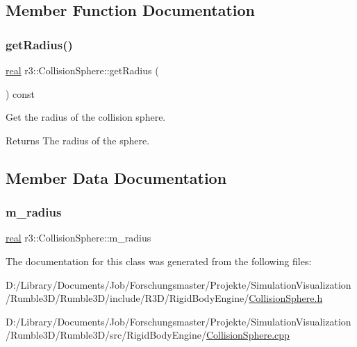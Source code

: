 \subsection{Member Function Documentation}
\mbox{\label{classr3_1_1_collision_sphere_aa3b7687165b34ab82b3bedb0884cc65b}} 
\subsubsection{\texorpdfstring{get\+Radius()}{getRadius()}}
{\footnotesize\ttfamily \mbox{\hyperlink{namespacer3_ab2016b3e3f743fb735afce242f0dc1eb}{real}} r3\+::\+Collision\+Sphere\+::get\+Radius (\begin{DoxyParamCaption}{ }\end{DoxyParamCaption}) const}



Get the radius of the collision sphere. 

\begin{DoxyReturn}{Returns}
The radius of the sphere. 
\end{DoxyReturn}


\subsection{Member Data Documentation}
\mbox{\label{classr3_1_1_collision_sphere_abc9e3dcae422b4732a288fa19d89d466}} 
\subsubsection{\texorpdfstring{m\+\_\+radius}{m\_radius}}
{\footnotesize\ttfamily \mbox{\hyperlink{namespacer3_ab2016b3e3f743fb735afce242f0dc1eb}{real}} r3\+::\+Collision\+Sphere\+::m\+\_\+radius\hspace{0.3cm}{\ttfamily [protected]}}



The documentation for this class was generated from the following files\+:\begin{DoxyCompactItemize}
\item 
D\+:/\+Library/\+Documents/\+Job/\+Forschungsmaster/\+Projekte/\+Simulation\+Visualization/\+Rumble3\+D/\+Rumble3\+D/include/\+R3\+D/\+Rigid\+Body\+Engine/\mbox{\hyperlink{_collision_sphere_8h}{Collision\+Sphere.\+h}}\item 
D\+:/\+Library/\+Documents/\+Job/\+Forschungsmaster/\+Projekte/\+Simulation\+Visualization/\+Rumble3\+D/\+Rumble3\+D/src/\+Rigid\+Body\+Engine/\mbox{\hyperlink{_collision_sphere_8cpp}{Collision\+Sphere.\+cpp}}\end{DoxyCompactItemize}
